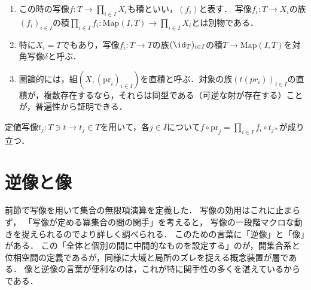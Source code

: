 \documentclass[uplatex,dvipdfmx]{jsreport}
\begin{document}
\begin{remark}\mbox{}
    \begin{enumerate}
        \item この時の写像$f:T\to \prod_{i\in I}X_i$も積といい，$(f_i)$と表す．
        写像$f_i:T\to X_i$の族$(f_i)_{i\in I}$の積$\prod_{i\in I}f_i:\mathrm{Map}(I,T)\to\prod_{i\in I}X_i$とは別物である．
        \item 特に$X_i=T$でもあり，写像$f_i:T\to T$の族$(\id_T)_{i\in I}$の積$T\to\mathrm{Map}(I,T)$を対角写像$\delta$と呼ぶ．
        \begin{center}\end{center}
        \item 圏論的には，組$(X, (\mathrm{pr}_i)_{i\in I})$を直積と呼ぶ．対象の族$(t(pr_i))_{i\in I}$の直積が，複数存在するなら，それらは同型である（可逆な射が存在する）ことが，普遍性から証明できる．
    \end{enumerate}
\end{remark}

\begin{proposition}
    定値写像$t_j:T\ni t\to t_j\in T$を用いて，各$j\in I$について$f\circ\mathrm{pr}_j = \prod_{i\in I}f_i\circ t_{j*}$が成り立つ．
\end{proposition}



\section{逆像と像}

\begin{screen}
    前節で写像を用いて集合の無限項演算を定義した．
    写像の効用はこれに止まらず，
    「写像が定める冪集合の間の関手」を考えると，
    写像の一段階マクロな動きを捉えられるのでより詳しく調べられる．
    このための言葉に「逆像」と「像」がある．
    この「全体と個別の間に中間的なものを設定する」のが，開集合系と位相空間の定義であるが，同様に大域と局所のズレを捉える概念装置が層である．
    像と逆像の言葉が便利なのは，これが特に関手性の多くを湛えているからである．
\end{screen}
\end{document}
